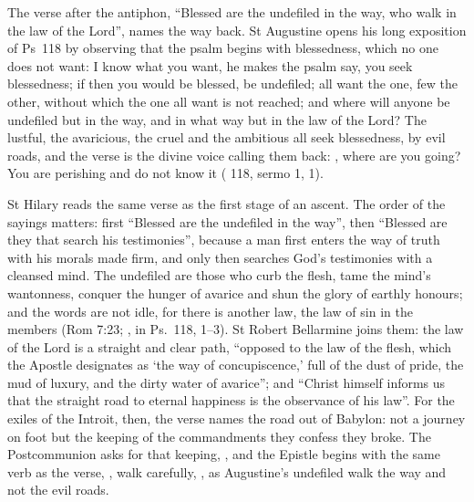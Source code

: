 The verse after the antiphon, ``Blessed are the undefiled in the way, who walk
in the law of the Lord'', names the way back. St Augustine opens his long
exposition of Ps~118 by observing that the psalm begins with blessedness, which
no one does not want:  I know what you
want, he makes the psalm say, you seek blessedness; if then you would be
blessed, be undefiled; all want the one, few the other, without which the one
all want is not reached; and where will anyone be undefiled but in the way, and
in what way but in the law of the Lord? The lustful, the avaricious, the cruel
and the ambitious all seek blessedness, by evil roads, and the verse is the
divine voice calling them back: , where
are you going? You are perishing and do not know it ( 118, sermo 1, 1).

St Hilary reads the same verse as the first stage of an ascent. The order of the
sayings matters: first ``Blessed are the undefiled in the way'', then ``Blessed
are they that search his testimonies'', because a man first enters the way of
truth with his morals made firm, and only then searches God's testimonies with a
cleansed mind. The undefiled are those who curb the flesh, tame the mind's
wantonness, conquer the hunger of avarice and shun the glory of earthly honours;
and the words  are not idle, for there is another law, the
law of sin in the members (Rom 7:23; , in
Ps.~118,  1--3). St Robert Bellarmine joins them: the law of the
Lord is a straight and clear path, ``opposed to the law of the flesh, which the
Apostle designates as `the way of concupiscence,' full of the dust of pride, the
mud of luxury, and the dirty water of avarice''; and ``Christ himself informs us
that the straight road to eternal happiness is the observance of his law''.
For the exiles of the Introit, then, the verse names the road out of Babylon:
not a journey on foot but the keeping of the commandments they confess they
broke. The Postcommunion asks for that keeping, , and the Epistle begins with the same verb as the verse, , walk carefully, , as Augustine's undefiled walk the way and not the evil roads.

